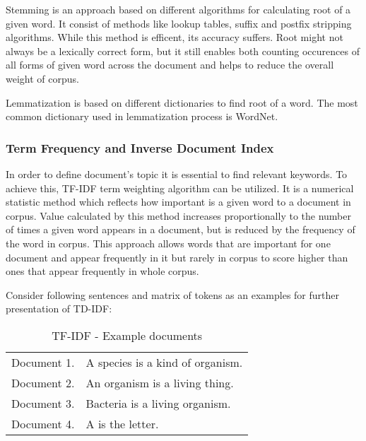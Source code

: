 Stemming is an approach based on different algorithms for calculating root of a given word. It consist of methods like lookup tables, suffix and postfix stripping algorithms. While this method is efficent, its accuracy suffers. Root might not always be a lexically correct form, but it still enables both counting occurences of all forms of given word across the document and helps to reduce the overall weight of corpus.

Lemmatization is based on different dictionaries to find root of a word. The most common dictionary used in lemmatization process is WordNet.

\subsubsection{Term Frequency and Inverse Document Index}
In order to define document's topic it is essential to find relevant keywords. To achieve this, TF-IDF term weighting algorithm can be utilized. It is a numerical statistic method which reflects how important is a given word to a document in corpus. Value calculated by this method increases proportionally to the number of times a given word appears in a document, but is reduced by the frequency of the word in corpus. This approach allows words that are important for one document and appear frequently in it but rarely in corpus to score higher than ones that appear frequently in whole corpus.

Consider following sentences and matrix of tokens as an examples for further presentation of TD-IDF:

\begin{table}[ht]
	\centering
	\caption{TF-IDF - Example documents}
	\label{tf_idf_example_sentences}
	\begin{tabular}{@{}ll@{}}
		Document 1. & A species is a kind of organism. \\
		Document 2. & An organism is a living thing.   \\
		Document 3. & Bacteria is a living organism.   \\
		Document 4. & A is the letter.                
	\end{tabular}
\end{table}

